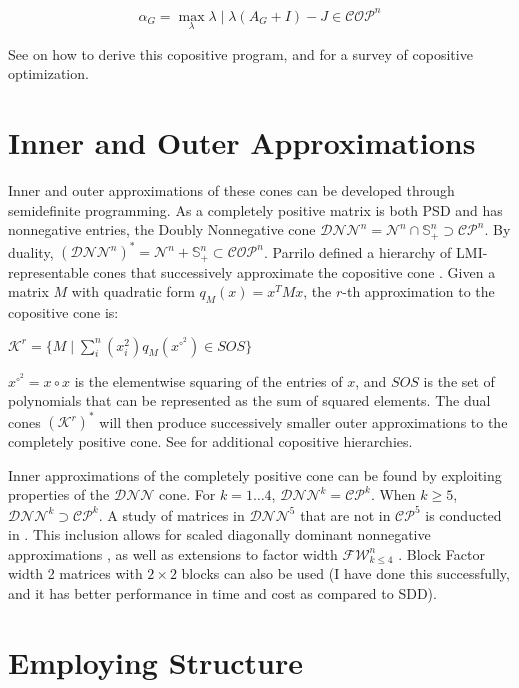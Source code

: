 \documentclass{article}
\newcommand{\psd}{\mathbb{S}}
\newcommand{\fw}{\mathcal{F}\mathcal{W}}
\newcommand{\N}{\mathcal{N}}
\newcommand{\dnn}{\mathcal{D}\mathcal{N}\mathcal{N}}
\newcommand{\cp}{\mathcal{C}\mathcal{P}}
\newcommand{\cop}{\mathcal{C}\mathcal{O}\mathcal{P}}
\begin{document}
\[\alpha_G = \max_\lambda \lambda \mid \lambda(A_G + I) - J \in \cop^n\]

See \cite{de2002approximation} on how to derive this copositive program, and \cite{bomze2012copositive} for a survey of copositive optimization.

\section{Inner and Outer Approximations}

Inner and outer approximations of these cones can be developed through semidefinite programming. As a completely positive matrix is both PSD and has nonnegative entries, the Doubly Nonnegative cone $\dnn^n= \N^n \cap \psd_+^n \supset \cp^n$. By duality, $(\dnn^n)^* = \N^n + \psd_+^n \subset \cop^n$. Parrilo defined a hierarchy of LMI-representable cones that successively approximate the copositive cone \cite{parrilo2000structured}. Given a matrix $M$ with quadratic form $q_M(x) = x^T M x$, the $r$-th approximation to the copositive cone is:

$\mathcal{K}^r = \{M \mid \sum_i^n(x_i^2) q_M(x^{\circ^2}) \in SOS\}$

$x^{\circ^2} = x \circ x$ is the elementwise squaring of the entries of $x$, and $SOS$ is the set of polynomials that can be represented as the sum of squared elements. The dual cones $(\mathcal{K}^r)^*$ will then produce successively smaller outer approximations to the completely positive cone. See \cite{de2002approximation, pena2007computing} for additional copositive hierarchies.


Inner approximations of the completely positive cone can be found by exploiting properties of the $\dnn$ cone. For $k = 1 \ldots 4$, $\dnn^k = \cp^k$. When $k \geq 5$, $\dnn^k \supset \cp^k$. A study of matrices in $\dnn^5$ that are not in $\cp^5$ is conducted in \cite{burer2009difference}. This inclusion allows for scaled diagonally dominant nonnegative approximations \cite{gouveia2018inner}, as well as extensions to factor width $\fw^n_{k \leq 4}$ \cite{ding2018higherorder}. Block Factor width  2 matrices with $2\times2$ blocks can also be used \cite{zheng2019block} (I have done this successfully, and it has better performance in time and cost as compared to SDD).

\section{Employing Structure}
\end{document}
